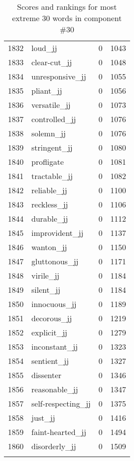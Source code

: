 \begin{longtable}[!htbp]{| rlr@{.}l |}
    1832 & loud\_jj & 0 & 1043 \\
    1833 & clear-cut\_jj & 0 & 1048 \\
    1834 & unresponsive\_jj & 0 & 1055 \\
    1835 & pliant\_jj & 0 & 1056 \\
    1836 & versatile\_jj & 0 & 1073 \\
    1837 & controlled\_jj & 0 & 1076 \\
    1838 & solemn\_jj & 0 & 1076 \\
    1839 & stringent\_jj & 0 & 1080 \\
    1840 & profligate & 0 & 1081 \\
    1841 & tractable\_jj & 0 & 1082 \\
    1842 & reliable\_jj & 0 & 1100 \\
    1843 & reckless\_jj & 0 & 1106 \\
    1844 & durable\_jj & 0 & 1112 \\
    1845 & improvident\_jj & 0 & 1137 \\
    1846 & wanton\_jj & 0 & 1150 \\
    1847 & gluttonous\_jj & 0 & 1171 \\
    1848 & virile\_jj & 0 & 1184 \\
    1849 & silent\_jj & 0 & 1184 \\
    1850 & innocuous\_jj & 0 & 1189 \\
    1851 & decorous\_jj & 0 & 1219 \\
    1852 & explicit\_jj & 0 & 1279 \\
    1853 & inconstant\_jj & 0 & 1323 \\
    1854 & sentient\_jj & 0 & 1327 \\
    1855 & dissenter & 0 & 1346 \\
    1856 & reasonable\_jj & 0 & 1347 \\
    1857 & self-respecting\_jj & 0 & 1375 \\
    1858 & just\_jj & 0 & 1416 \\
    1859 & faint-hearted\_jj & 0 & 1494 \\
    1860 & disorderly\_jj & 0 & 1509 \\
    \hline
    \caption{Scores and rankings for most extreme 30 words in component \#30} \\
\end{longtable}
